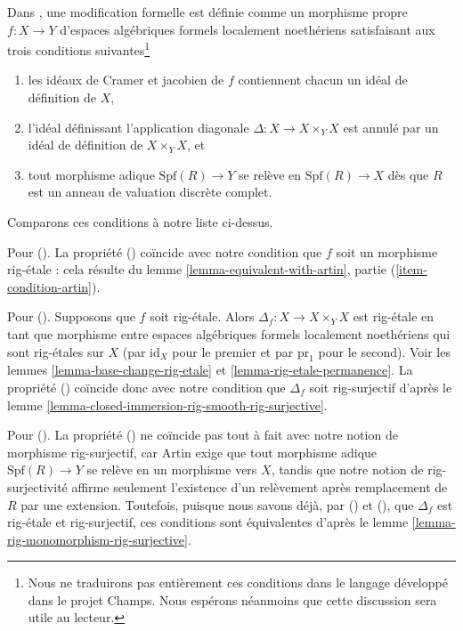 \begin{remark}
\label{remark-compare-formal-modification-artin}
Dans \cite[définition 1.7]{ArtinII}, une modification formelle est définie
comme un morphisme propre $f : X \to Y$ d'espaces algébriques formels
localement noethériens satisfaisant aux trois conditions suivantes\footnote{Nous
ne traduirons pas entièrement ces conditions dans le langage développé dans
le projet Champs. Nous espérons néanmoins que cette discussion sera utile au
lecteur.}
\begin{enumerate}
\item[(\romannumeral1)] les idéaux de Cramer et jacobien de
$f$ contiennent chacun un idéal de définition de $X$,
\item[(\romannumeral2)] l'idéal définissant l'application
diagonale $\Delta : X \to X \times_Y X$
est annulé par un idéal de définition de $X \times_Y X$, et
\item[(\romannumeral3)] tout morphisme adique $\text{Spf}(R) \to Y$
se relève en $\text{Spf}(R) \to X$ dès que $R$ est un
anneau de valuation discrète complet.
\end{enumerate}
Comparons ces conditions à notre liste ci-dessus.

\medskip\noindent
Pour (). La propriété () coïncide avec notre
condition que $f$ soit un morphisme rig-étale : cela résulte du
lemme \ref{lemma-equivalent-with-artin}, partie (\ref{item-condition-artin}).

\medskip\noindent
Pour (). Supposons que $f$ soit rig-étale. Alors
$\Delta_f : X \to X \times_Y X$ est rig-étale en tant que morphisme
entre espaces algébriques formels localement noethériens qui sont
rig-étales sur $X$ (par $\text{id}_X$ pour le premier et par
$\text{pr}_1$ pour le second).
Voir les lemmes \ref{lemma-base-change-rig-etale} et
\ref{lemma-rig-etale-permanence}.
La propriété () coïncide donc avec notre condition
que $\Delta_f$ soit rig-surjectif d'après le
lemme \ref{lemma-closed-immersion-rig-smooth-rig-surjective}.

\medskip\noindent
Pour (). La propriété () ne coïncide pas tout à
fait avec notre notion de morphisme rig-surjectif, car Artin exige que tout
morphisme adique $\text{Spf}(R) \to Y$ se relève en un morphisme vers $X$,
tandis que notre notion de rig-surjectivité affirme seulement l'existence
d'un relèvement après remplacement de $R$ par une extension.
Toutefois, puisque nous savons déjà, par () et
(), que $\Delta_f$ est rig-étale et rig-surjectif,
ces conditions sont équivalentes d'après le
lemme \ref{lemma-rig-monomorphism-rig-surjective}.
\end{remark}

